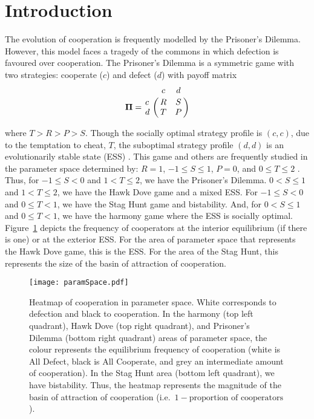 \documentclass[reprint,aps,pre,twocolumn]{revtex4-1}
\begin{document}
\maketitle


\section{\label{sec:level1}Introduction}

The evolution of cooperation is frequently modelled by the Prisoner's Dilemma. However, this model faces a tragedy of the commons in which defection is favoured over cooperation. The Prisoner's Dilemma is a symmetric game with two strategies: cooperate ($c$) and defect ($d$) with payoff matrix
\begin{equation}
  \mathbf{\Pi} = 
    \bordermatrix{ & c & d \cr
      c & R & S \cr
      d & T & P } \label{payoffMatrix}
\end{equation}

\noindent where $T > R > P > S$. Though the socially optimal strategy profile is $(c,c)$, due to the temptation to cheat, $T$, the suboptimal strategy profile $(d,d)$ is an evolutionarily stable state (ESS) \cite{hofbauer98}. This game and others are frequently studied in the parameter space determined by: $R = 1$, $-1 \leq S \leq 1$, $P = 0$, and $0 \leq T \leq 2$ \cite{santos06}. Thus, for $-1 \leq S < 0$ and $1 < T \leq 2$, we have the Prisoner's Dilemma. $0 < S \leq 1$ and $1 < T \leq 2$, we have the Hawk Dove game and a mixed ESS. For $-1 \leq S < 0$ and $0 \leq T < 1$, we have the Stag Hunt game and bistability. And, for $0 < S \leq 1$ and $0 \leq T < 1$, we have the harmony game where the ESS is socially optimal. Figure~\ref{default} depicts the frequency of cooperators at the interior equilibrium (if there is one) or at the exterior ESS. For the area of parameter space that represents the Hawk Dove game, this is the ESS. For the area of the Stag Hunt, this represents the size of the basin of attraction of cooperation.

\begin{figure}
\texttt{[image: paramSpace.pdf]}
\caption[Heatmap of cooperation in parameter space.]{Heatmap of cooperation in parameter space. White corresponds to defection and black to cooperation. In the harmony (top left quadrant), Hawk Dove (top right quadrant), and Prisoner's Dilemma (bottom right quadrant) areas of parameter space, the colour represents the equilibrium frequency of cooperation (white is All Defect, black is All Cooperate, and grey an intermediate amount of cooperation). In the Stag Hunt area (bottom left quadrant), we have bistability. Thus, the heatmap represents the magnitude of the basin of attraction of cooperation (i.e.\ $1 - \text{proportion of cooperators}$).}
\label{default}
\end{figure}
\end{document}
